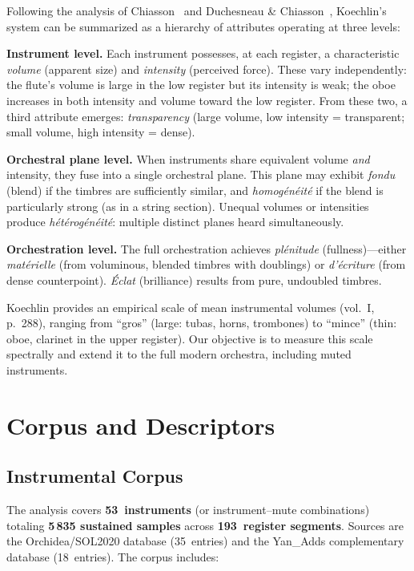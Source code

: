 \documentclass[journal]{IEEEtran}
\begin{document}
Following the analysis of Chiasson~\cite{Chiasson2008, ChiassonHumaniste} and Duchesneau \& Chiasson~\cite{DuchesneauChiasson}, Koechlin's system can be summarized as a hierarchy of attributes operating at three levels:

\textbf{Instrument level.} Each instrument possesses, at each register, a characteristic \textit{volume} (apparent size) and \textit{intensity} (perceived force). These vary independently: the flute's volume is large in the low register but its intensity is weak; the oboe increases in both intensity and volume toward the low register. From these two, a third attribute emerges: \textit{transparency} (large volume, low intensity = transparent; small volume, high intensity = dense).

\textbf{Orchestral plane level.} When instruments share equivalent volume \emph{and} intensity, they fuse into a single orchestral plane. This plane may exhibit \textit{fondu} (blend) if the timbres are sufficiently similar, and \textit{homogénéité} if the blend is particularly strong (as in a string section). Unequal volumes or intensities produce \textit{hétérogénéité}: multiple distinct planes heard simultaneously.

\textbf{Orchestration level.} The full orchestration achieves \textit{plénitude} (fullness)---either \textit{matérielle} (from voluminous, blended timbres with doublings) or \textit{d'écriture} (from dense counterpoint). \textit{Éclat} (brilliance) results from pure, undoubled timbres.

Koechlin provides an empirical scale of mean instrumental volumes (vol.~I, p.~288), ranging from ``gros'' (large: tubas, horns, trombones) to ``mince'' (thin: oboe, clarinet in the upper register). Our objective is to measure this scale spectrally and extend it to the full modern orchestra, including muted instruments.

\section{Corpus and Descriptors}
\label{sec:corpus}

\subsection{Instrumental Corpus}

The analysis covers \textbf{53~instruments} (or instrument--mute combinations) totaling \textbf{5\,835 sustained samples} across \textbf{193~register segments}. Sources are the Orchidea/SOL2020 database (35~entries) and the Yan\_Adds complementary database (18~entries). The corpus includes:
\end{document}

